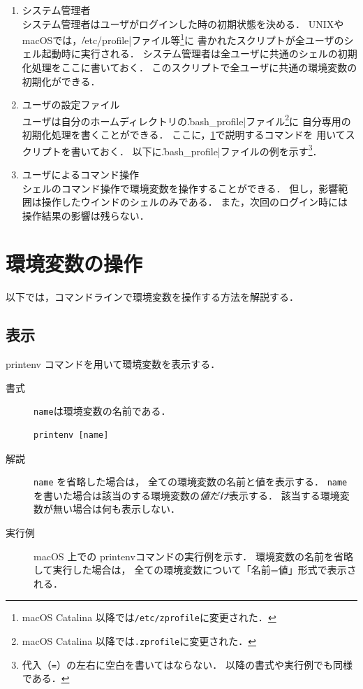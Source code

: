 \begin{enumerate}
\item システム管理者 \\
  システム管理者はユーザがログインした時の初期状態を決める．
  UNIXやmacOSでは，\|/etc/profile|ファイル等\footnote{
    macOS Catalina 以降では\texttt{/etc/zprofile}に変更された．}に
  書かれたスクリプトが全ユーザのシェル起動時に実行される．
  システム管理者は全ユーザに共通のシェルの初期化処理をここに書いておく．
  このスクリプトで全ユーザに共通の環境変数の初期化ができる．
\item ユーザの設定ファイル \\
  ユーザは自分のホームディレクトリの\|.bash_profile|ファイル\footnote{
    macOS Catalina 以降では\texttt{.zprofile}に変更された．}に
  自分専用の初期化処理を書くことができる．
  ここに，\ref{environmentVariableOperation}で説明するコマンドを
  用いてスクリプトを書いておく．
  以下に\|.bash_profile|ファイルの例を示す\footnote{
    代入（\texttt{=}）の左右に空白を書いてはならない．
    以降の書式や実行例でも同様である．}．
  
\item ユーザによるコマンド操作 \\
  シェルのコマンド操作で環境変数を操作することができる．
  但し，影響範囲は操作したウインドのシェルのみである．
  また，次回のログイン時には操作結果の影響は残らない．
\end{enumerate}

\section{環境変数の操作}\label{environmentVariableOperation}
以下では，コマンドラインで環境変数を操作する方法を解説する．

\subsection{表示}
printenv コマンドを用いて環境変数を表示する．

\begin{description}
\item[書式] \texttt{name}は環境変数の名前である．
\begin{lstlisting}[numbers=none]
  printenv [name]
\end{lstlisting}
\item[解説]
  \texttt{name} を省略した場合は，
  全ての環境変数の名前と値を表示する．
  \texttt{name} を書いた場合は該当のする環境変数の\emph{値だけ}表示する．
  該当する環境変数が無い場合は何も表示しない．
\item [実行例]  macOS 上での printenvコマンドの実行例を示す．
  環境変数の名前を省略して実行した場合は，
  全ての環境変数について「名前=値」形式で表示される．
  
\end{description}

